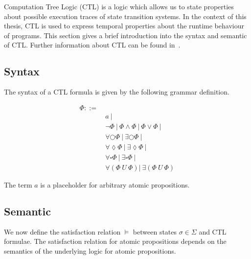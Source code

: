 \documentclass[11pt,a4paper,titlepage]{article}
\begin{document}
Computation Tree Logic (CTL) is a logic which allows us to state properties about possible execution traces of state transition systems. 
In the context of this thesis, CTL is used to express temporal properties about the runtime behaviour of programs. 
This section gives a brief introduction into the syntax and semantic of CTL. 
Further information about CTL can be found in~\cite{baier2008principles}.

\subsection{Syntax}
The syntax of a CTL formula is given by the following grammar definition.

\begin{align*}
    \Phi  ::= \ & \\ 
    & a \ | \\
    & \neg \Phi \ | \ \Phi \land \Phi \ | \ \Phi \lor \Phi \ | \\
    & \forall\bigcirc\Phi \ | \ \exists\bigcirc\Phi \ | \\
    & \forall\lozenge\Phi \ | \ \exists\lozenge\Phi \ | \\
    & \forall\square\Phi \ | \ \exists\square\Phi \ | \\
    & \forall(\Phi \ U \ \Phi) | \ \exists(\Phi \ U \ \Phi) 
\end{align*}

The term $a$ is a placeholder for arbitrary atomic propositions.

\subsection{Semantic}

We now define the satisfaction relation $\models$ between states $\sigma \in \Sigma$ and CTL formulae.
The satisfaction relation for atomic propositions depends on the semantics of the underlying 
logic for atomic propositions.
\end{document}
